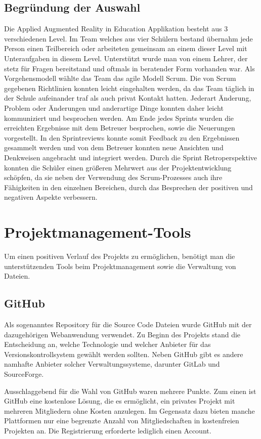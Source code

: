 \subsection{Begründung der Auswahl}
Die Applied Augmented Reality in Education Applikation besteht aus 3 verschiedenen Level.
Im Team welches aus vier Schülern bestand übernahm jede Person einen Teilbereich oder arbeiteten
gemeinsam an einem dieser Level mit Unteraufgaben in diesem Level. Unterstützt wurde man von einem
Lehrer, der stetz für Fragen bereitstand und oftmals in beratender Form vorhanden war. Als
Vorgehensmodell wählte das Team das agile Modell Scrum. Die von Scrum gegebenen Richtlinien
konnten leicht eingehalten werden, da das Team täglich in der Schule aufeinander
traf als auch privat Kontakt hatten. Jederart Änderung, Problem oder Änderungen und anderartige
Dinge konnten daher leicht kommuniziert und besprochen werden. Am Ende jedes Sprints wurden
die erreichten Ergebnisse mit dem Betreuer besprochen, sowie die Neuerungen vorgestellt.
In den Sprintreviews konnte somit Feedback zu den Ergebnissen gesammelt werden und von dem
Betreuer konnten neue Ansichten und Denkweisen angebracht und integriert werden.
Durch die Sprint Retroperspektive konnten die Schüler einen größeren Mehrwert aus der
Projektentwicklung schöpfen, da sie neben der Verwendung des Scrum-Prozesses auch ihre Fähigkeiten
in den einzelnen Bereichen, durch das Besprechen der positiven und negativen Aspekte verbessern.

\section{Projektmanagement-Tools}
Um einen positiven Verlauf des Projekts zu ermöglichen, benötigt man die unterstützenden
Tools beim Projektmanagement sowie die Verwaltung von Dateien.

\subsection{GitHub}
Als sogenanntes Repository für die Source Code Dateien wurde GitHub mit der dazugehörigen
Webanwendung verwendet. Zu Beginn des Projekts stand die Entscheidung an, welche Technologie
und welcher Anbieter für das Versionskontrollsystem gewählt werden sollten. Neben GitHub gibt es
andere namhafte Anbieter solcher Verwaltungssysteme, darunter GitLab und SourceForge.

Ausschlaggebend für die Wahl von GitHub waren mehrere Punkte. Zum einen ist GitHub eine
kostenlose Lösung, die es ermöglicht, ein privates Projekt mit mehreren Mitgliedern
ohne Kosten anzulegen. Im Gegensatz dazu bieten manche Plattformen nur eine begrenzte Anzahl
von Mitgliedschaften in kostenfreien Projekten an. Die Registrierung erforderte lediglich
einen Account.

